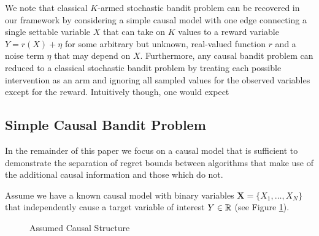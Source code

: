 We note that classical $K$-armed stochastic bandit problem can be recovered in our framework by considering a simple causal model with one edge connecting a single settable variable $X$ that can take on $K$ values to a reward variable $Y = r(X) + \eta$ for some arbitrary but unknown, real-valued function $r$ and a noise term $\eta$ that may depend on $X$.
Furthermore, any causal bandit problem can reduced to a classical stochastic bandit problem by treating each possible intervention as an arm and ignoring all sampled values for the observed variables except for the reward.
Intuitively though, one would expect 


\subsection{Simple Causal Bandit Problem}

In the remainder of this paper we focus on a causal model that is sufficient to demonstrate the separation of regret bounds between algorithms that make use of the additional causal information and those which do not.

Assume we have a known causal model with binary variables $\boldsymbol{X} = \{X_{1},\ldots,X_{N}\}$ that independently cause a 
target variable of interest $Y \in \mathbb R$ (see Figure \ref{fig:causalStructure}).
\begin{figure}[h]
\centering
\caption{Assumed Causal Structure}
\label{fig:causalStructure}
\end{figure}


